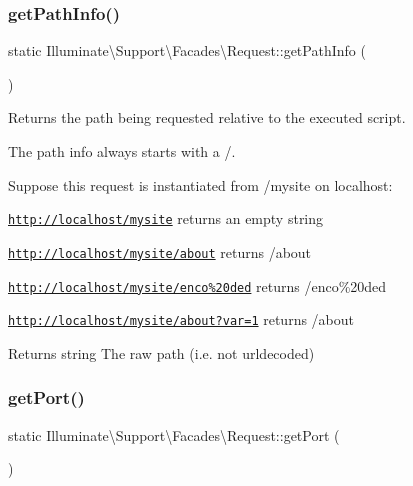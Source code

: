 \subsubsection{\texorpdfstring{get\+Path\+Info()}{getPathInfo()}}
{\footnotesize\ttfamily static Illuminate\textbackslash{}\+Support\textbackslash{}\+Facades\textbackslash{}\+Request\+::get\+Path\+Info (\begin{DoxyParamCaption}{ }\end{DoxyParamCaption})\hspace{0.3cm}{\ttfamily [static]}}

Returns the path being requested relative to the executed script.

The path info always starts with a /.

Suppose this request is instantiated from /mysite on localhost\+:


\begin{DoxyItemize}
\item \href{http://localhost/mysite}{\tt http\+://localhost/mysite} returns an empty string
\item \href{http://localhost/mysite/about}{\tt http\+://localhost/mysite/about} returns \textquotesingle{}/about\textquotesingle{}
\item \href{http://localhost/mysite/enco%20ded}{\tt http\+://localhost/mysite/enco\%20ded} returns \textquotesingle{}/enco\%20ded\textquotesingle{}
\item \href{http://localhost/mysite/about?var=1}{\tt http\+://localhost/mysite/about?var=1} returns \textquotesingle{}/about\textquotesingle{}
\end{DoxyItemize}

\begin{DoxyReturn}{Returns}
string The raw path (i.\+e. not urldecoded) 
\end{DoxyReturn}
\mbox{\label{class_illuminate_1_1_support_1_1_facades_1_1_request_afc28cdf3fdcae21e6c5d0596b041c5e8}} 
\subsubsection{\texorpdfstring{get\+Port()}{getPort()}}
{\footnotesize\ttfamily static Illuminate\textbackslash{}\+Support\textbackslash{}\+Facades\textbackslash{}\+Request\+::get\+Port (\begin{DoxyParamCaption}{ }\end{DoxyParamCaption})\hspace{0.3cm}{\ttfamily [static]}}

